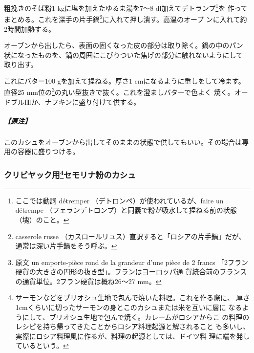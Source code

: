 \begin{recette}
粗挽きのそば粉1 kgに塩を加えたゆるま湯を7〜8
dl加えてデトランプ\footnote{ここでは動詞 détremper
  （デトロンペ）が使われているが、faire un détrempe
  （フェランデトロンプ）と同義で粉が吸水して捏ねる前の状態（塊）のこと。}を
作ってまとめる。これを深手の片手鍋\footnote{casserole russe
  （カスロールリュス）直訳すると「ロシアの片手鍋」だが、通常は深い片手鍋をそう呼ぶ。}に入れて押し潰す。高温のオーブ
ンに入れて約2時間加熱する。

オーブンから出したら、表面の固くなった皮の部分は取り除く。鍋の中のパン
状になったものを、鍋の周囲にこびりついた焦げの部分に触れないようにして
取り出す。

これにバター100 gを加えて捏ねる。厚さ1 cmになるように重しをして冷ます。
直径25 mm位の\footnote{原文 un emporte-pièce rond de la grandeur d'une
  pièce de 2 francs
  「2フラン硬貨の大きさの円形の抜き型」。フランはヨーロッパ通
  貨統合前のフランスの通貨単位。2フラン硬貨は概ね26〜27 mm。}の丸い型抜きで抜く。これを澄ましバターで色よく
焼く。オードブル皿か、ナフキンに盛り付けて供する。

\hypertarget{ux539fux6ce8}{%
\subparagraph{【原注】}\label{ux539fux6ce8}}

このカシュをオーブンから出してそのままの状態で供してもいい。その場合は専用の容器に盛りつける。

\maeaki

\hypertarget{kache-de-semoule-pour-coulibiac}{%
\subsubsection[クリビヤック用セモリナ粉のカシュ]{\texorpdfstring{クリビヤック用\footnote{サーモンなどをブリオシュ生地で包んで焼いた料理。これを作る際に、
  厚さ1cmくらいに切ったサーモンの身とこのカシュまたは米を互いに層に
  なるようにして、ブリオシュ生地で包んで焼く。カレームがロシアからこ
  の料理のレシピを持ち帰ってきたことからロシア料理起源と解されること
  も多いし、実際にロシア料理風に作るが、料理の起源としては、ドイツ料
  理に端を発しているという。}セモリナ粉のカシュ}{クリビヤック用セモリナ粉のカシュ}}\label{kache-de-semoule-pour-coulibiac}}




\end{recette}
